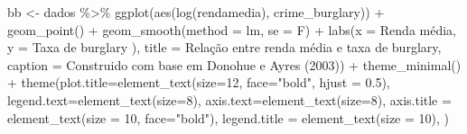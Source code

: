 \documentclass[
]{article}
\newenvironment{Shaded}{\begin{snugshade}}{\end{snugshade}}
\newcommand{\AttributeTok}[1]{\textcolor[rgb]{0.77,0.63,0.00}{#1}}
\newcommand{\DecValTok}[1]{\textcolor[rgb]{0.00,0.00,0.81}{#1}}
\newcommand{\FloatTok}[1]{\textcolor[rgb]{0.00,0.00,0.81}{#1}}
\newcommand{\FunctionTok}[1]{\textcolor[rgb]{0.00,0.00,0.00}{#1}}
\newcommand{\NormalTok}[1]{#1}
\newcommand{\OtherTok}[1]{\textcolor[rgb]{0.56,0.35,0.01}{#1}}
\newcommand{\SpecialCharTok}[1]{\textcolor[rgb]{0.00,0.00,0.00}{#1}}
\newcommand{\StringTok}[1]{\textcolor[rgb]{0.31,0.60,0.02}{#1}}
\begin{document}
\begin{Shaded}
\begin{Highlighting}[]
\NormalTok{bb }\OtherTok{\textless{}{-}}\NormalTok{ dados }\SpecialCharTok{\%\textgreater{}\%} 
  \FunctionTok{ggplot}\NormalTok{(}\FunctionTok{aes}\NormalTok{(}\FunctionTok{log}\NormalTok{(rendamedia), crime\_burglary)) }\SpecialCharTok{+}
  \FunctionTok{geom\_point}\NormalTok{() }\SpecialCharTok{+} 
  \FunctionTok{geom\_smooth}\NormalTok{(}\AttributeTok{method =} \StringTok{\textquotesingle{}lm\textquotesingle{}}\NormalTok{, }\AttributeTok{se =}\NormalTok{ F) }\SpecialCharTok{+}
  \FunctionTok{labs}\NormalTok{(}\AttributeTok{x =} \StringTok{\textquotesingle{}Renda média\textquotesingle{}}\NormalTok{,}
       \AttributeTok{y =} \StringTok{\textquotesingle{}Taxa de burglary )\textquotesingle{}}\NormalTok{,}
       \AttributeTok{title =} \StringTok{\textquotesingle{}Relação entre renda média e taxa de burglary\textquotesingle{}}\NormalTok{,}
       \AttributeTok{caption =} \StringTok{\textquotesingle{}Construido com base em Donohue e Ayres (2003)\textquotesingle{}}\NormalTok{) }\SpecialCharTok{+} 
  \FunctionTok{theme\_minimal}\NormalTok{() }\SpecialCharTok{+}
  \FunctionTok{theme}\NormalTok{(}\AttributeTok{plot.title=}\FunctionTok{element\_text}\NormalTok{(}\AttributeTok{size=}\DecValTok{12}\NormalTok{, }\AttributeTok{face=}\StringTok{"bold"}\NormalTok{, }\AttributeTok{hjust =} \FloatTok{0.5}\NormalTok{),}
        \AttributeTok{legend.text=}\FunctionTok{element\_text}\NormalTok{(}\AttributeTok{size=}\DecValTok{8}\NormalTok{),}
        \AttributeTok{axis.text=}\FunctionTok{element\_text}\NormalTok{(}\AttributeTok{size=}\DecValTok{8}\NormalTok{),}
        \AttributeTok{axis.title =} \FunctionTok{element\_text}\NormalTok{(}\AttributeTok{size =} \DecValTok{10}\NormalTok{, }\AttributeTok{face=}\StringTok{"bold"}\NormalTok{),}
        \AttributeTok{legend.title =} \FunctionTok{element\_text}\NormalTok{(}\AttributeTok{size =} \DecValTok{10}\NormalTok{),}
\NormalTok{  )}



\end{Highlighting}
\end{Shaded}
\end{document}
